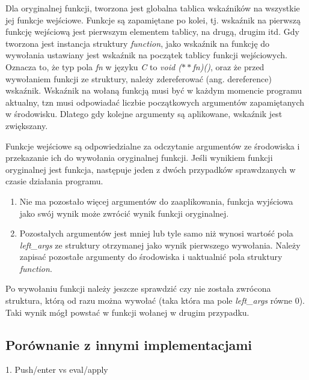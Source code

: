 \documentclass[declaration,shortabstract]{iithesis}
\begin{document}
Dla oryginalnej funkcji, tworzona jest globalna tablica wskaźników na wszystkie 
jej funkcje wejściowe. Funkcje są zapamiętane po kolei, tj. 
wskaźnik na pierwszą funkcję wejściową jest pierwszym elementem tablicy, na 
drugą, drugim itd. 
Gdy tworzona jest instancja struktury \textit{function}, jako wskaźnik na 
funkcję do wywołania ustawiany jest wskaźnik na początek tablicy funkcji 
wejściowych. Oznacza to, że typ pola \textit{fn} w języku \textit{C} to 
\textit{void ($\ast\ast$fn)()}, oraz że przed wywołaniem funkcji ze struktury,
należy zdereferować (ang. dereference) wskaźnik. Wskaźnik na wołaną funkcją 
musi być w każdym momencie programu aktualny, tzn musi odpowiadać liczbie 
początkowych argumentów zapamiętanych w środowisku. Dlatego gdy kolejne 
argumenty są aplikowane, wskaźnik jest zwiększany. 


Funkcje wejściowe są odpowiedzialne za odczytanie argumentów ze środowiska i 
przekazanie ich do wywołania oryginalnej funkcji. Jeśli wynikiem funkcji 
oryginalnej jest funkcja, następuje jeden z dwóch przypadków sprawdzanych w
czasie działania programu.

\begin{enumerate}
  \item Nie ma pozostało więcej argumentów do zaaplikowania, 
  funkcja wyjściowa jako swój wynik może zwrócić wynik funkcji oryginalnej.
  \item Pozostałych argumentów jest mniej lub tyle samo niż wynosi 
  wartość pola \textit{left\_args} ze struktury otrzymanej jako wynik 
  pierwszego wywołania.
  Należy zapisać pozostałe argumenty do środowiska i uaktualnić pola struktury 
  \textit{function}.
\end{enumerate}

Po wywołaniu funkcji należy jeszcze sprawdzić czy nie została zwrócona 
struktura, którą od razu można wywołać (taka która ma pole \textit{left\_args} 
równe $0$). Taki wynik mógł powstać w funkcji wołanej w drugim przypadku.

\subsection{Porównanie z innymi implementacjami}

1. Push/enter vs eval/apply
\end{document}
